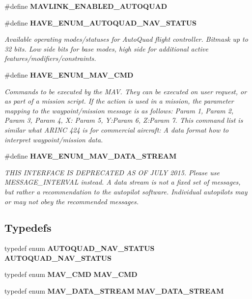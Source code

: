 \begin{DoxyCompactItemize}
\item 
\#define \textbf{ M\+A\+V\+L\+I\+N\+K\+\_\+\+E\+N\+A\+B\+L\+E\+D\+\_\+\+A\+U\+T\+O\+Q\+U\+AD}
\item 
\#define \textbf{ H\+A\+V\+E\+\_\+\+E\+N\+U\+M\+\_\+\+A\+U\+T\+O\+Q\+U\+A\+D\+\_\+\+N\+A\+V\+\_\+\+S\+T\+A\+T\+US}
\begin{DoxyCompactList}\small\item\em Available operating modes/statuses for Auto\+Quad flight controller. Bitmask up to 32 bits. Low side bits for base modes, high side for additional active features/modifiers/constraints. \end{DoxyCompactList}\item 
\#define \textbf{ H\+A\+V\+E\+\_\+\+E\+N\+U\+M\+\_\+\+M\+A\+V\+\_\+\+C\+MD}
\begin{DoxyCompactList}\small\item\em Commands to be executed by the M\+AV. They can be executed on user request, or as part of a mission script. If the action is used in a mission, the parameter mapping to the waypoint/mission message is as follows\+: Param 1, Param 2, Param 3, Param 4, X\+: Param 5, Y\+:Param 6, Z\+:Param 7. This command list is similar what A\+R\+I\+NC 424 is for commercial aircraft\+: A data format how to interpret waypoint/mission data. \end{DoxyCompactList}\item 
\#define \textbf{ H\+A\+V\+E\+\_\+\+E\+N\+U\+M\+\_\+\+M\+A\+V\+\_\+\+D\+A\+T\+A\+\_\+\+S\+T\+R\+E\+AM}
\begin{DoxyCompactList}\small\item\em T\+H\+IS I\+N\+T\+E\+R\+F\+A\+CE IS D\+E\+P\+R\+E\+C\+A\+T\+ED AS OF J\+U\+LY 2015. Please use M\+E\+S\+S\+A\+G\+E\+\_\+\+I\+N\+T\+E\+R\+V\+AL instead. A data stream is not a fixed set of messages, but rather a recommendation to the autopilot software. Individual autopilots may or may not obey the recommended messages. \end{DoxyCompactList}\end{DoxyCompactItemize}
\subsection*{Typedefs}
\begin{DoxyCompactItemize}
\item 
typedef enum \textbf{ A\+U\+T\+O\+Q\+U\+A\+D\+\_\+\+N\+A\+V\+\_\+\+S\+T\+A\+T\+US} \textbf{ A\+U\+T\+O\+Q\+U\+A\+D\+\_\+\+N\+A\+V\+\_\+\+S\+T\+A\+T\+US}
\item 
typedef enum \textbf{ M\+A\+V\+\_\+\+C\+MD} \textbf{ M\+A\+V\+\_\+\+C\+MD}
\item 
typedef enum \textbf{ M\+A\+V\+\_\+\+D\+A\+T\+A\+\_\+\+S\+T\+R\+E\+AM} \textbf{ M\+A\+V\+\_\+\+D\+A\+T\+A\+\_\+\+S\+T\+R\+E\+AM}
\end{DoxyCompactItemize}
